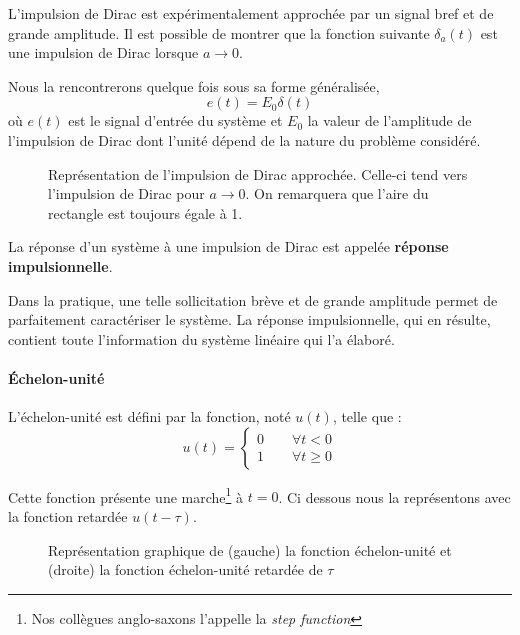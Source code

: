 L'impulsion de Dirac est expérimentalement approchée par un signal 
bref et de grande amplitude. Il est possible de montrer que la fonction
suivante $\delta_a(t)$ est une impulsion de Dirac lorsque $a\to0$.

Nous la rencontrerons quelque fois sous sa forme généralisée, 
$$
e(t)=E_0\delta(t)
$$
où $e(t)$ est le signal d'entrée du système et $E_0$ la valeur de l'amplitude 
de l'impulsion de Dirac dont l'unité dépend de la nature du problème considéré.
\begin{figure}[!h]
\begin{center}

    \caption{Représentation de l'impulsion de Dirac approchée. 
    Celle-ci tend vers l'impulsion de Dirac pour $a\to0$. On remarquera 
    que l'aire du rectangle est toujours égale à 1.\label{fig-dirac2}}
\end{center}
\end{figure}

La réponse d'un système à une impulsion de Dirac est appelée 
\textbf{réponse impulsionnelle}.

Dans la pratique, une telle sollicitation brève et de grande amplitude
permet de parfaitement caractériser le système. La réponse impulsionnelle, 
qui en résulte, contient toute l'information du système 
linéaire qui l'a élaboré.

\paragraph{\'Echelon-unité}
L'échelon-unité est défini par la fonction, noté $u(t)$, telle que :
$$
u(t)=
\begin{cases} 
0 \qquad \forall t<0    \\ 
1 \qquad \forall t\geq 0 
\end{cases}
$$

Cette fonction présente une marche\footnote{Nos 
collègues anglo-saxons l'appelle la \og\emph{step function}\fg} à $t=0$. 
Ci dessous nous la représentons avec la fonction retardée $u(t-\tau)$.
\begin{figure}[!h]
\begin{center}

\end{center}
\caption{Représentation graphique de (gauche) la fonction échelon-unité 
         et (droite) la fonction échelon-unité retardée de $\tau$
         \label{fig-echelon}}
\end{figure}

